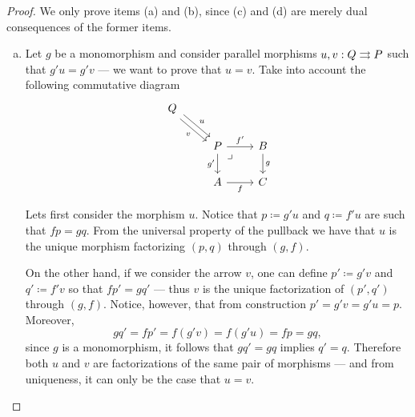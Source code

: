 \begin{proof}
We only prove items (a) and (b), since (c) and (d) are merely dual consequences
of the former items.
\begin{enumerate}[(a)]\setlength\itemsep{0em}
\item Let \(g\) be a monomorphism and consider parallel morphisms \(u, v: Q
  \rightrightarrows P\) such that \(g' u = g' v\) --- we want to prove that \(u = v\). Take
  into account the following commutative diagram
  \[
  \begin{tikzcd}
  Q \ar[rd, shift left, "u"] \ar[rd, shift right, "v"'] & & \\
  &P \ar[r, "f'"] \ar[d, "g'"']
  \ar[rd, phantom, very near start, "\lrcorner"]
  &B \ar[d, "g"] \\
  &A \ar[r, "f"'] &C
  \end{tikzcd}
  \]

  Lets first consider the morphism \(u\). Notice that \(p \coloneq g' u\) and
  \(q \coloneq f' u\) are such that \(f p = g q\). From the universal property
  of the pullback we have that \(u\) is the unique morphism factorizing
  \((p, q)\) through \((g, f)\).

  On the other hand, if we consider the arrow \(v\), one can define
  \(p' \coloneq g' v\) and \(q' \coloneq f' v\) so that \(f p' = g q'\) --- thus
  \(v\) is the unique factorization of \((p', q')\) through \((g, f)\). Notice,
  however, that from construction \(p' = g' v = g' u = p\). Moreover,
  \[
  g q' = f p' = f (g' v) = f (g' u) = f p = g q,
  \]
  since \(g\) is a monomorphism, it follows that \(g q' = g q\) implies
  \(q' = q\). Therefore both \(u\) and \(v\) are factorizations of the same pair
  of morphisms --- and from uniqueness, it can only be the case that \(u = v\).


\end{enumerate}
\end{proof}
